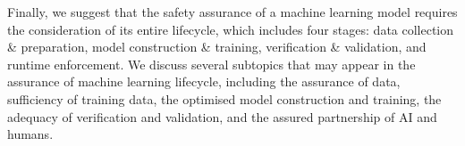 \begin{partbacktext}
Finally, we suggest that the safety assurance of a machine learning model requires the consideration of its entire lifecycle, which includes four stages: data collection \& preparation, model construction \& training, verification \& validation, and runtime enforcement. We discuss  several subtopics that may appear in the assurance of machine learning lifecycle, including the assurance of data, sufficiency of training data, the optimised model construction and training, the adequacy of verification and validation, and the assured partnership of AI and humans. 

\end{partbacktext}
